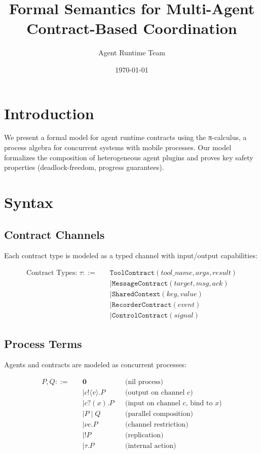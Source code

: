 \documentclass{article}
\title{Formal Semantics for Multi-Agent Contract-Based Coordination}
\author{Agent Runtime Team}
\date{\today}
\begin{document}
\maketitle

\section{Introduction}

We present a formal model for agent runtime contracts using the π-calculus, a process algebra for concurrent systems with mobile processes. Our model formalizes the composition of heterogeneous agent plugins and proves key safety properties (deadlock-freedom, progress guarantees).

\section{Syntax}

\subsection{Contract Channels}

Each contract type is modeled as a typed channel with input/output capabilities:

\begin{align*}
\text{Contract Types: } \tau ::=\quad 
  &\mathtt{ToolContract}(tool\_name, args, result) \\
  &| \mathtt{MessageContract}(target, msg, ack) \\
  &| \mathtt{SharedContext}(key, value) \\
  &| \mathtt{RecorderContract}(event) \\
  &| \mathtt{ControlContract}(signal)
\end{align*}

\subsection{Process Terms}

Agents and contracts are modeled as concurrent processes:

\begin{align*}
P, Q ::=\quad 
  &\mathbf{0} && \text{(nil process)} \\
  &| c!\langle v \rangle.P && \text{(output on channel $c$)} \\
  &| c?(x).P && \text{(input on channel $c$, bind to $x$)} \\
  &| P \mid Q && \text{(parallel composition)} \\
  &| \nu c.P && \text{(channel restriction)} \\
  &| !P && \text{(replication)} \\
  &| \tau.P && \text{(internal action)}
\end{align*}
\end{document}
